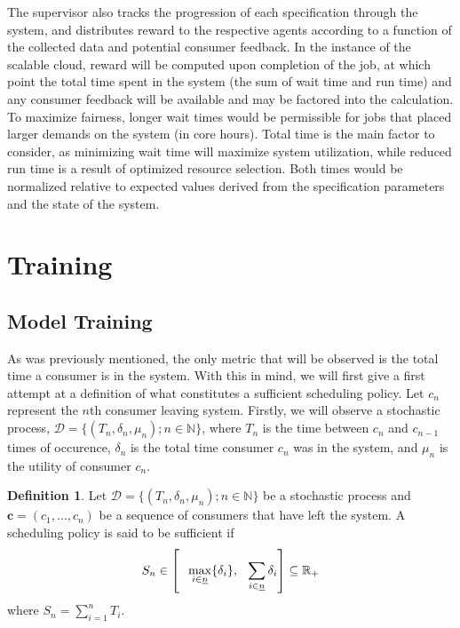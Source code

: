 \documentclass{article}
\theoremstyle{definition}
\newtheorem{definition}{Definition}[section]
\theoremstyle{remark}
\begin{document}
		The supervisor also tracks the progression of each specification through the system, and distributes reward to the respective agents according to a function of the collected data and potential consumer feedback. In the instance of the scalable cloud, reward will be computed upon completion of the job, at which point the total time spent in the system (the sum of wait time and run time) and any consumer feedback will be available and may be factored into the calculation. To maximize fairness, longer wait times would be permissible for jobs that placed larger demands on the system (in core hours). Total time is the main factor to consider, as minimizing wait time will maximize system utilization, while reduced run time is a result of optimized resource selection. Both times would be normalized relative to expected values derived from the specification parameters and the state of the system.

	\section{Training}

		\subsection{Model Training}
		
		As was previously mentioned, the only metric that will be observed is the total time a consumer is in the system. With this in mind, we will first give a first attempt at a definition of what constitutes a sufficient scheduling policy. Let $c_{n}$ represent the $n$th consumer leaving system. Firstly, we will observe a stochastic process, $\mathcal{D} = \{(T_{n}, \delta_{n}, \mu_{n}); n \in \mathbb{N}\}$, where $T_{n}$ is the time between $c_{n}$ and $c_{n-1}$ times of occurence, $\delta_{n}$ is the total time consumer $c_{n}$ was in the system, and $\mu_{n}$ is the utility of consumer $c_{n}$.
	
		\begin{definition}
			Let $\mathcal{D} = \{(T_{n}, \delta_{n}, \mu_{n}); n \in \mathbb{N}\}$ be a stochastic process and $\mathbf{c} = (c_{1}, \ldots ,c_{n})$ be a sequence of consumers that have left the system. A scheduling policy is said to be sufficient if
			\[
			S_{n} \in \left[\hspace{0.1in}\max_{i \in \underline{n}}\{\delta_{i}\}, \hspace{0.1in} \sum_{i \in \underline{n}}{\delta_{i}}\right] \subseteq \mathbb{R}_{+}
			\] 
			where $S_{n} = \sum_{i=1}^{n}{T_{i}}$.
		\end{definition}
		
\end{document}
